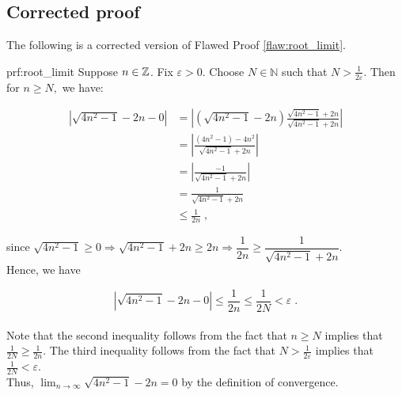 \clearpage
\subsection{Corrected proof}

The following is a corrected version of Flawed Proof \ref{flaw:root_limit}. %

\begin{prf}{prf:root_limit} %
Suppose $n \in \mathbb Z$. Fix $\varepsilon > 0.$ Choose $N \in \mathbb{N}$ such that $N> \frac{1}{2\varepsilon}$. Then for $n \geq N,$ we have:

 \begin{align*}
    \left | \sqrt{4n^2-1} - 2n - 0 \right | &= \left | \left(\sqrt{4n^2-1} - 2n\right) \frac{\sqrt{4n^2-1} + 2n}{\sqrt{4n^2-1} + 2n}\right | \\
    &= \left | \frac{(4n^2-1)-4n^2}{\sqrt{4n^2-1}+2n} \right | \\
    &= \left |\frac{-1}{\sqrt{4n^2-1} + 2n} \right | \\
    &=\frac{1}{\sqrt{4n^2-1} + 2n} \\
    &\leq \frac{1}{2n}\;,
 \end{align*}

since $\sqrt{4n^2-1}\geq 0 \Rightarrow \sqrt{4n^2-1}+2n\geq 2n \Rightarrow \dfrac{1}{2n}\geq \dfrac{1}{\sqrt{4n^2-1}+2n}$. \\

Hence, we have

$$ \left| \sqrt{4n^2-1} - 2n - 0 \right | \leq \frac{1}{2n} \leq \frac{1}{2N} < \varepsilon\;.$$ \\

Note that the second inequality follows from the fact that $n\geq N$ implies that $\frac{1}{2N}\geq\frac{1}{2n}$. The third inequality follows from the fact that $N> \frac{1}{2\varepsilon}$ implies that $\frac1{2N} < \varepsilon$. \\

Thus, $\displaystyle \lim_{n \rightarrow \infty} \sqrt{4n^2-1} - 2n = 0$ by the definition of convergence.
\end{prf} 